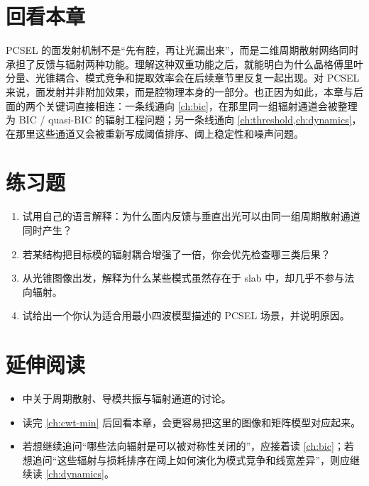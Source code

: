 \section*{回看本章}
PCSEL 的面发射机制不是“先有腔，再让光漏出来”，而是二维周期散射网络同时承担了反馈与辐射两种功能。理解这种双重功能之后，就能明白为什么晶格傅里叶分量、光锥耦合、模式竞争和提取效率会在后续章节里反复一起出现。对 PCSEL 来说，面发射并非附加效果，而是腔物理本身的一部分。也正因为如此，本章与后面的两个关键词直接相连：一条线通向 \cref{ch:bic}，在那里同一组辐射通道会被整理为 BIC / quasi-BIC 的辐射工程问题；另一条线通向 \cref{ch:threshold,ch:dynamics}，在那里这些通道又会被重新写成阈值排序、阈上稳定性和噪声问题。

\section*{练习题}
\begin{enumerate}
  \item \basicq 试用自己的语言解释：为什么面内反馈与垂直出光可以由同一组周期散射通道同时产生？

  \item \basicq 若某结构把目标模的辐射耦合增强了一倍，你会优先检查哪三类后果？

  \item \midq 从光锥图像出发，解释为什么某些模式虽然存在于 slab 中，却几乎不参与法向辐射。

  \item \hardq 试给出一个你认为适合用最小四波模型描述的 PCSEL 场景，并说明原因。
\end{enumerate}

\section*{延伸阅读}
\begin{itemize}
  \item \cite{joannopoulos2008,fan2002guided} 中关于周期散射、导模共振与辐射通道的讨论。

  \item 读完 \cref{ch:cwt-min} 后回看本章，会更容易把这里的图像和矩阵模型对应起来。

  \item 若想继续追问“哪些法向辐射是可以被对称性关闭的”，应接着读 \cref{ch:bic}；若想追问“这些辐射与损耗排序在阈上如何演化为模式竞争和线宽差异”，则应继续读 \cref{ch:dynamics}。
\end{itemize}

